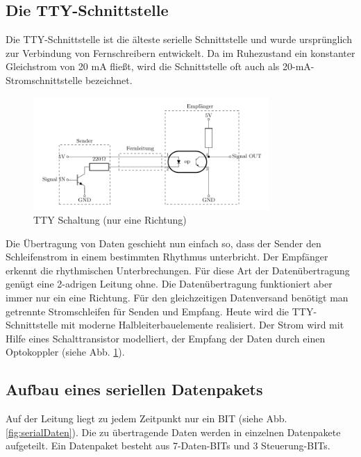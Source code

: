 \subsection{Die TTY-Schnittstelle} 
Die TTY-Schnittstelle ist die älteste serielle Schnittstelle und wurde ursprünglich zur Verbindung von Fernschreibern entwickelt.  Da im Ruhezustand ein konstanter Gleichstrom von 20 mA fließt, wird die Schnittstelle oft auch als 20-mA-Stromschnittstelle bezeichnet.
\begin{figure}[htbp]
  \begin{center}
  \includegraphics[width=0.8\textwidth]{Anhang/Tikz/tty-schaltung.pdf}
  \caption{TTY Schaltung (nur eine Richtung)}
  \label{fig:ttySchaltung}  
  \end{center}
\end{figure}
Die Übertragung von Daten geschieht nun einfach so, dass der Sender den Schleifenstrom in einem bestimmten Rhythmus unterbricht. Der Empfänger erkennt die rhythmischen Unterbrechungen. Für diese Art der Datenübertragung genügt eine 2-adrigen Leitung ohne. Die Datenübertragung funktioniert aber immer nur ein eine Richtung. Für den gleichzeitigen Datenversand benötigt man getrennte Stromschleifen für Senden und Empfang. Heute wird die TTY-Schnittstelle mit moderne Halbleiterbauelemente realisiert. Der Strom wird mit Hilfe eines Schalttransistor modelliert, der Empfang der Daten durch einen Optokoppler (siehe Abb. \ref{fig:ttySchaltung}).

\subsection{Aufbau eines seriellen Datenpakets}
Auf der Leitung liegt zu jedem Zeitpunkt nur ein BIT (siehe Abb. \ref{fig:serialDaten}). 
Die zu übertragende Daten werden in einzelnen Datenpakete aufgeteilt. Ein Datenpaket besteht aus 7-Daten-BITs und 3 Steuerung-BITs.

